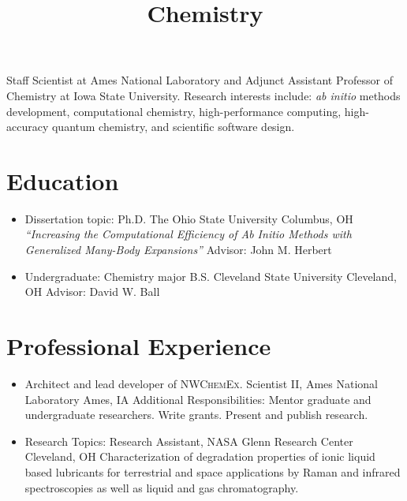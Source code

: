 \documentclass[11pt,a4paper,sans]{moderncv}
\title{Chemistry}
\begin{document}
\makecvtitle

\small{
	Staff Scientist at Ames National Laboratory and Adjunct Assistant
    Professor of Chemistry at Iowa State University.  Research interests
    include: \textit{ab initio} methods development, computational chemistry,
    high-performance computing, high-accuracy quantum chemistry, and scientific
	software design.
}


\section{Education}
\vspace{5pt}

\begin{itemize}
	\item{
		  {Dissertation topic:}
		  {Ph.D. The Ohio State University}
		  {Columbus, OH}
		  {}
		  {\textit{``Increasing the Computational Efficiency of Ab Initio
		  		 Methods with Generalized Many-Body Expansions''}}
 		  {Advisor:  John M. Herbert}
 		  {}}
	\item{
		  {Undergraduate: Chemistry major}
		  {B.S. Cleveland State University}
		  {Cleveland, OH}
		  {Advisor: David W. Ball}
		  {}}
\end{itemize}


\section{Professional Experience}
\vspace{5pt}
\begin{itemize}
	\item{
		  {Architect and lead developer of \textsc{NWChemEx}.}
		  {Scientist II, Ames National Laboratory}
		  {Ames, IA}
		  {}
		  {Additional Responsibilities: Mentor graduate and undergraduate researchers. 
		   Write grants. Present and publish research.}
	}
	\item{
 		  {Research Topics:}
 		  {Research Assistant, NASA Glenn Research Center}
 		  {Cleveland, OH}
 		  {}
 		  {Characterization of degradation properties of ionic liquid based
 		   lubricants for terrestrial and space applications by Raman and
 		   infrared spectroscopies as well as liquid and gas chromatography.}
 	          {}
	}
\end{itemize}
\end{document}

